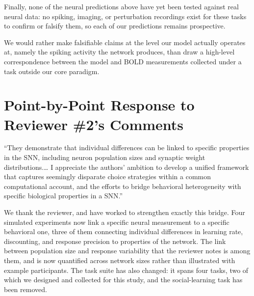 \begin{ms}
Finally, none of the neural predictions above have yet been tested against real neural data: no spiking, imaging, or perturbation recordings exist for these tasks to confirm or falsify them, so each of our predictions remains prospective.
\end{ms}

We would rather make falsifiable claims at the level our model actually operates at, namely the spiking activity the network produces, than draw a high-level correspondence between the model and BOLD measurements collected under a task outside our core paradigm.

\section*{Point-by-Point Response to Reviewer \#2's Comments}

{\small\color{revred}``They demonstrate that individual differences can be linked to specific properties in the SNN, including neuron population sizes and synaptic weight distributions.\ldots{} I appreciate the authors' ambition to develop a unified framework that captures seemingly disparate choice strategies within a common computational account, and the efforts to bridge behavioral heterogeneity with specific biological properties in a SNN.''}

We thank the reviewer, and have worked to strengthen exactly this bridge. Four simulated experiments now link a specific neural measurement to a specific behavioral one, three of them connecting individual differences in learning rate, discounting, and response precision to properties of the network. The link between population size and response variability that the reviewer notes is among them, and is now quantified across network sizes rather than illustrated with example participants. The task suite has also changed: it spans four tasks, two of which we designed and collected for this study, and the social-learning task has been removed.


